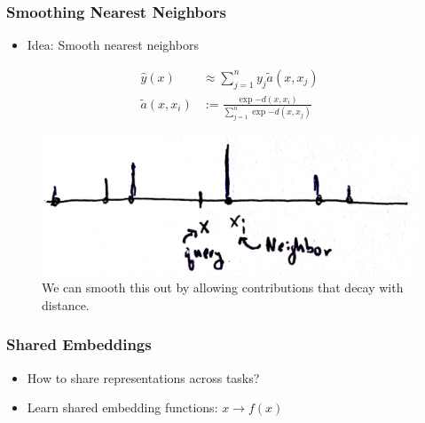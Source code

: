 \documentclass[10pt,mathserif]{beamer}
\begin{document}
\begin{frame}
  \frametitle{Smoothing Nearest Neighbors}
 \begin{itemize}
 \item Idea: Smooth nearest neighbors
 \end{itemize} 
 \begin{align}
   \hat{y}\left(x\right) &\approx \sum_{j = 1}^{n} y_j \tilde{a}\left(x, x_j\right) \\
   \tilde{a}\left(x, x_i\right) &:= \frac{\exp{-d\left(x, x_i\right)}}{\sum_{j = 1}^{n} \exp{-d\left(x, x_j\right)}}
 \end{align} 
\begin{figure}[ht]
  \centering
  \includegraphics[width=0.7\paperwidth]{figure/soft_a_fun}
  \caption{We can smooth this out by allowing contributions that decay with
    distance. \label{fig:soft_a_fun} }
\end{figure}
\end{frame}

\begin{frame}
  \frametitle{Shared Embeddings}
 \begin{itemize}
 \item How to share representations across tasks? 
 \item Learn shared embedding functions: $x \rightarrow f\left(x\right)$
 \end{itemize} 
\end{frame}
\end{document}
